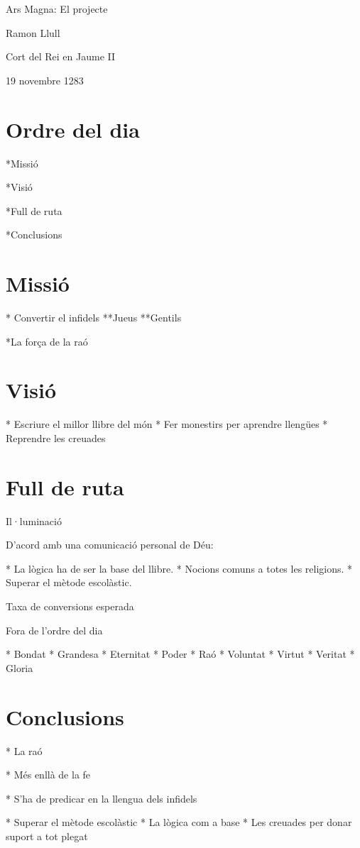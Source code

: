\documentclass{beamer}
\begin{document}
Ars Magna: El projecte

Ramon Llull

Cort del Rei en Jaume II

19 novembre 1283


\section{Ordre del dia}

*Missió 

*Visió

*Full de ruta
  
 *Conclusions

\section{Missió}


* Convertir el infidels
    	**Jueus
    	**Gentils

*La força de la raó


\section{Visió}


* Escriure el millor llibre del món
* Fer monestirs per aprendre llengües 
* Reprendre les creuades



\section{Full de ruta}



Il·luminació

D'acord amb una comunicació personal de Déu:

* La lògica ha de ser la base del llibre.
* Nocions comuns a totes les religions.
* Superar el mètode escolàstic.


Taxa de conversions esperada






Fora de l'ordre del dia

* Bondat
* Grandesa 
* Eternitat
* Poder
* Raó
* Voluntat
* Virtut
* Veritat
* Gloria


\section{Conclusions}

* La raó

* Més enllà de la fe

* S'ha de predicar en la llengua dels infidels



* Superar el mètode escolàstic
* La lògica com a base
* Les creuades per donar suport a tot plegat
\end{document}
